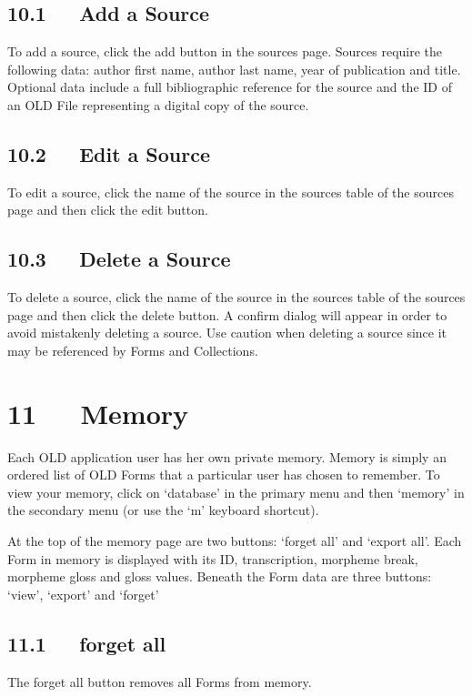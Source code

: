 \documentclass[letterpaper,10pt,english]{sphinxmanual}
\begin{document}
\section{10.1   Add a Source}
\label{user_guide:add-a-source}
To add a source, click the add button in the sources page.  Sources require the
following data: author first name, author last name, year of publication and
title.  Optional data include a full bibliographic reference for the source and
the ID of an OLD File representing a digital copy of the source.


\section{10.2   Edit a Source}
\label{user_guide:edit-a-source}
To edit a source, click the name of the source in the sources table of the
sources page and then click the edit button.


\section{10.3   Delete a Source}
\label{user_guide:delete-a-source}
To delete a source, click the name of the source in the sources table of the
sources page and then click the delete button.  A confirm dialog will appear in
order to avoid mistakenly deleting a source.  Use caution when deleting a source
since it may be referenced by Forms and Collections.


\chapter{11   Memory}
\label{user_guide:memory}
Each OLD application user has her own private memory.  Memory is simply an
ordered list of OLD Forms that a particular user has chosen to remember.  To
view your memory, click on `database' in the primary menu and then `memory' in
the secondary menu (or use the `m' keyboard shortcut).

At the top of the memory page are two buttons: `forget all' and `export all'.
Each Form in memory is displayed with its ID, transcription, morpheme break,
morpheme gloss and gloss values.  Beneath the Form data are three buttons:
`view', `export' and `forget'


\section{11.1   forget all}
\label{user_guide:forget-all}
The forget all button removes all Forms from memory.
\end{document}
